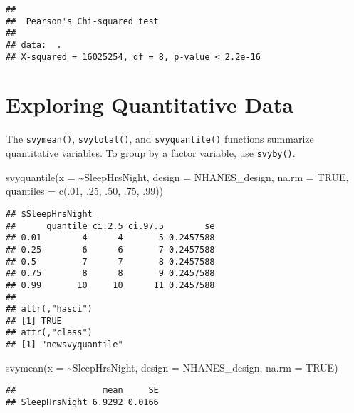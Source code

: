 \documentclass[
]{book}
\newenvironment{Shaded}{\begin{snugshade}}{\end{snugshade}}
\newcommand{\AttributeTok}[1]{\textcolor[rgb]{0.77,0.63,0.00}{#1}}
\newcommand{\ConstantTok}[1]{\textcolor[rgb]{0.00,0.00,0.00}{#1}}
\newcommand{\DecValTok}[1]{\textcolor[rgb]{0.00,0.00,0.81}{#1}}
\newcommand{\FunctionTok}[1]{\textcolor[rgb]{0.00,0.00,0.00}{#1}}
\newcommand{\NormalTok}[1]{#1}
\newcommand{\SpecialCharTok}[1]{\textcolor[rgb]{0.00,0.00,0.00}{#1}}
\theoremstyle{definition}
\theoremstyle{definition}
\theoremstyle{definition}
\theoremstyle{definition}
\theoremstyle{remark}
\begin{document}
\begin{verbatim}
## 
##  Pearson's Chi-squared test
## 
## data:  .
## X-squared = 16025254, df = 8, p-value < 2.2e-16
\end{verbatim}

\hypertarget{exploring-quantitative-data}{%
\section{Exploring Quantitative Data}\label{exploring-quantitative-data}}

The \texttt{svymean()}, \texttt{svytotal()}, and \texttt{svyquantile()} functions summarize quantitative variables. To group by a factor variable, use \texttt{svyby()}.

\begin{Shaded}
\begin{Highlighting}[]
\FunctionTok{svyquantile}\NormalTok{(}\AttributeTok{x =} \SpecialCharTok{\textasciitilde{}}\NormalTok{SleepHrsNight, }
            \AttributeTok{design =}\NormalTok{ NHANES\_design, }
            \AttributeTok{na.rm =} \ConstantTok{TRUE}\NormalTok{, }
            \AttributeTok{quantiles =} \FunctionTok{c}\NormalTok{(.}\DecValTok{01}\NormalTok{, .}\DecValTok{25}\NormalTok{, .}\DecValTok{50}\NormalTok{, .}\DecValTok{75}\NormalTok{, .}\DecValTok{99}\NormalTok{))}
\end{Highlighting}
\end{Shaded}

\begin{verbatim}
## $SleepHrsNight
##      quantile ci.2.5 ci.97.5        se
## 0.01        4      4       5 0.2457588
## 0.25        6      6       7 0.2457588
## 0.5         7      7       8 0.2457588
## 0.75        8      8       9 0.2457588
## 0.99       10     10      11 0.2457588
## 
## attr(,"hasci")
## [1] TRUE
## attr(,"class")
## [1] "newsvyquantile"
\end{verbatim}

\begin{Shaded}
\begin{Highlighting}[]
\FunctionTok{svymean}\NormalTok{(}\AttributeTok{x =} \SpecialCharTok{\textasciitilde{}}\NormalTok{SleepHrsNight, }\AttributeTok{design =}\NormalTok{ NHANES\_design, }\AttributeTok{na.rm =} \ConstantTok{TRUE}\NormalTok{)}
\end{Highlighting}
\end{Shaded}

\begin{verbatim}
##                 mean     SE
## SleepHrsNight 6.9292 0.0166
\end{verbatim}
\end{document}
